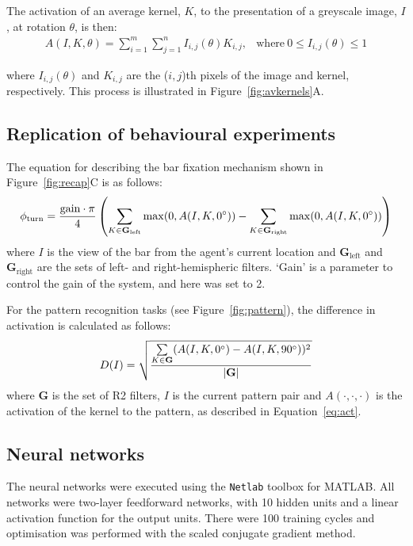 \documentclass[10pt]{article}
\newcommand{\Matlab}{MATLAB}
\begin{document}
The activation of an average kernel, $K$, to the presentation of a greyscale image, $I$, at rotation $\theta$, is then:
\begin{equation}
\label{eq:act}
\begin{array}{rl}
A(I,K,\theta) = {\sum\limits^m_{i=1} \sum\limits^n_{j=1} I_{i,j}(\theta)K_{i,j}}, &\mathrm{where\ } 0 \le I_{i,j}(\theta) \le 1
\end{array}
\end{equation}

where $I_{i,j}(\theta)$ and $K_{i,j}$ are the ($i,j$)th pixels of the image and kernel, respectively. This process is illustrated in Figure~\ref{fig:avkernels}A.

\subsection{Replication of behavioural experiments}
\label{sec:methods:replication}
The equation for describing the bar fixation mechanism shown in Figure~\ref{fig:recap}C is as follows:
$$
\phi_\mathrm{turn} = \frac{\mathrm{gain}\cdot \pi}{4}\left( \sum\limits_{K\in \mathbf{G}_\mathrm{left}}\max(0,A(I,K,0\degree)) - \sum\limits_{K\in \mathbf{G}_\mathrm{right}}\max(0,A(I,K,0\degree)) \right)
$$
where $I$ is the view of the bar from the agent's current location and $\mathbf{G}_\mathrm{left}$ and $\mathbf{G}_\mathrm{right}$ are the sets of left- and right-hemispheric filters. `Gain' is a parameter to control the gain of the system, and here was set to 2.

For the pattern recognition tasks (see Figure~\ref{fig:pattern}), the difference in activation is calculated as follows:
$$
D(I) = \sqrt{\frac{\sum\limits_{K\in \mathbf{G}}(A(I,K,0\degree)-A(I,K,90\degree))^2}{|\mathbf{G}|}}
$$
where $\mathbf{G}$ is the set of R2 filters, $I$ is the current pattern pair and $A(\cdot,\cdot,\cdot)$ is the activation of the kernel to the pattern, as described in Equation~\ref{eq:act}.

\subsection{Neural networks}
\label{sec:methods:neuralnetworks}
The neural networks were executed using the \texttt{Netlab} toolbox for \Matlab.
All networks were two-layer feedforward networks, with 10 hidden units and a linear activation function for the output units.
There were 100 training cycles and optimisation was performed with the scaled conjugate gradient method.
\end{document}
